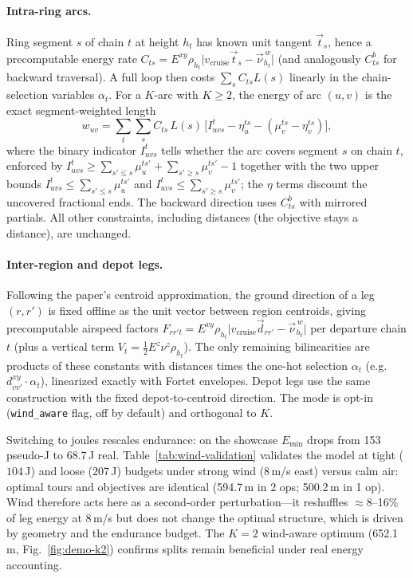 \documentclass[12pt]{elsarticle}
\begin{document}
\paragraph{Intra-ring arcs.}  Ring segment $s$ of chain $t$ at height $h_t$ has known unit tangent $\vec t_s$, hence a precomputable energy rate $C_{ts} = E^{xy}\rho_{h_t}\lvert v_{\text{cruise}}\vec t_s - \vec\nu^{\,w}_{h_t}\rvert$ (and analogously $C^b_{ts}$ for backward traversal).  A full loop then costs $\sum_s C_{ts}L(s)$ linearly in the chain-selection variables $\alpha_t$.  For a $K$-arc with $K\ge 2$, the energy of arc $(u,v)$ is the exact segment-weighted length
\[
w_{uv} = \sum_{t}\sum_{s} C_{ts}\,L(s)\,\bigl[I_{uvs}^t - \eta_u^{ts} - (\mu_v^{ts}-\eta_v^{ts})\bigr],
\tag{W-C$_1$}\label{eq:w_wind_arc}
\]
where the binary indicator $I_{uvs}^t$ tells whether the arc covers segment $s$ on chain $t$, enforced by $I_{uvs}^t \ge \sum_{s'\le s}\mu_u^{ts'} + \sum_{s'\ge s}\mu_v^{ts'} - 1$ together with the two upper bounds $I_{uvs}^t \le \sum_{s'\le s}\mu_u^{ts'}$ and $I_{uvs}^t \le \sum_{s'\ge s}\mu_v^{ts'}$; the $\eta$ terms discount the uncovered fractional ends.  The backward direction uses $C^b_{ts}$ with mirrored partials.  All other constraints, including distances (the objective stays a distance), are unchanged.

\paragraph{Inter-region and depot legs.}  Following the paper's centroid approximation, the ground direction of a leg $(r,r')$ is fixed offline as the unit vector between region centroids, giving precomputable airspeed factors $F_{rr't} = E^{xy}\rho_{h_t}\lvert v_{\text{cruise}}\vec d_{rr'} - \vec\nu^{\,w}_{h_t}\rvert$ per departure chain $t$ (plus a vertical term $V_t = \tfrac12 E^{z}\nu^z\rho_{h_t}$).  The only remaining bilinearities are products of these constants with distances times the one-hot selection $\alpha_t$ (e.g.\ $d^{xy}_{vv'}\cdot\alpha_t$), linearized exactly with Fortet envelopes.  Depot legs use the same construction with the fixed depot-to-centroid direction.  The mode is opt-in (\texttt{wind\_aware} flag, off by default) and orthogonal to $K$.

Switching to joules rescales endurance: on the showcase $E_{\min}$ drops from 153 pseudo-J to $68.7$\,J real.  Table~\ref{tab:wind-validation} validates the model at tight ($104$\,J) and loose ($207$\,J) budgets under strong wind (8\,m/s east) versus calm air: optimal tours and objectives are identical (594.7\,m in 2 ops; 500.2\,m in 1 op).  Wind therefore acts here as a second-order perturbation---it reshuffles $\approx$8--16\% of leg energy at 8\,m/s but does not change the optimal structure, which is driven by geometry and the endurance budget.  The $K=2$ wind-aware optimum (652.1\,m, Fig.~\ref{fig:demo-k2}) confirms splits remain beneficial under real energy accounting.
\end{document}
